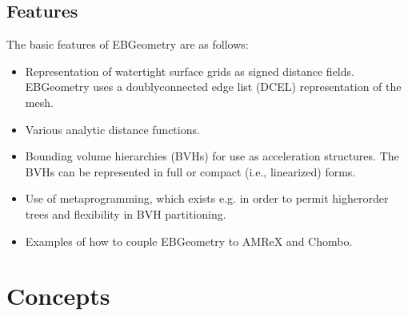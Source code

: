 \documentclass[letterpaper,10pt,english]{sphinxmanual}
\begin{document}
\section{Features}
\label{\detokenize{Introduction:features}}
\sphinxAtStartPar
The basic features of EBGeometry are as follows:
\begin{itemize}
\item {} 
\sphinxAtStartPar
Representation of water\sphinxhyphen{}tight surface grids as signed distance fields.
EBGeometry uses a doubly\sphinxhyphen{}connected edge list (DCEL) representation of the mesh.

\item {} 
\sphinxAtStartPar
Various analytic distance functions.

\item {} 
\sphinxAtStartPar
Bounding volume hierarchies (BVHs) for use as acceleration structures.
The BVHs can be represented in full or compact (i.e., linearized) forms.

\item {} 
\sphinxAtStartPar
Use of metaprogramming, which exists e.g. in order to permit higher\sphinxhyphen{}order trees and flexibility in BVH partitioning.

\item {} 
\sphinxAtStartPar
Examples of how to couple EBGeometry to AMReX and Chombo.

\end{itemize}


\chapter{Concepts}
\label{\detokenize{index:concepts}}
\sphinxstepscope
\end{document}

